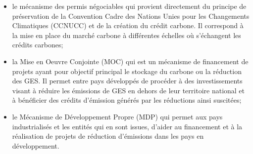\documentclass[
  12pt,
  a4paper,
  extrafontsizes,
  onecolumn,
  openright]{book}
\theoremstyle{definition}
\theoremstyle{definition}
\theoremstyle{definition}
\theoremstyle{definition}
\theoremstyle{remark}
\begin{document}
\begin{itemize}
\item
  le mécanisme des permis négociables qui provient directement du principe de préservation de la Convention Cadre des Nations Unies pour les Changements Climatiques (CCNUCC) et de la création du crédit carbone.
  Il correspond à la mise en place du marché carbone à différentes échelles où s'échangent les crédits carbones;
\item
  la Mise en Oeuvre Conjointe (MOC) qui est un mécanisme de financement de projets ayant pour objectif principal le stockage du carbone ou la réduction des GES. Il permet entre pays développés de procéder à des investissements visant à réduire les émissions de GES en dehors de leur territoire national et à bénéficier des crédits d'émission générés par les réductions ainsi suscitées;
\item
  le Mécanisme de Développement Propre (MDP) qui permet aux pays industrialisés et les entités qui en sont issues, d'aider au financement et à la réalisation de projets de réduction d'émissions dans les pays en développement.


\end{itemize}
\end{document}
